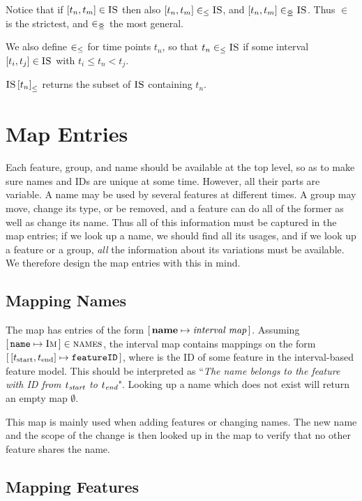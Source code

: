 Notice that if $\interval{t_n}{t_m} \in \map{IS}$ then also $\interval{t_n}{t_m} \inn \map{IS}$, and $\interval{t_n}{t_m} \innr \map{IS}$. Thus $\in$ is the strictest, and $\in_{\leq\!\!\!\!\geq{}}$ the most general.

We also define $\in_\leq$ for time points $t_n$, so that $t_n \in_\leq \textsc{IS}$ if some interval $\interval{t_i}{t_j} \in \map{IS}$ with $t_i \leq t_n < t_j$. 

${\textsc{IS} \left[ t_n \right]}_{\leq}$ returns the subset of $\textsc{IS}$ containing $t_n$.

\section{Map Entries}
\label{sec:map-entries}
Each feature, group, and name should be available at the top level, so as to make sure names and IDs are unique at some time. However, all their parts are variable. A name may be used by several features at different times. A group may move, change its type, or be removed, and a feature can do all of the former as well as change its name. Thus all of this information must be captured in the map entries; if we look up a name, we should find all its usages, and if we look up a feature or a group, \emph{all} the information about its variations must be available. We therefore design the map entries with this in mind.

\subsection{Mapping Names}
\label{sub:mapping-names}

The \names{} map has entries of the form $[ \,\textbf{name}{} \mapsto \textit{interval map}\, ]$. Assuming $[ \,\texttt{name} \mapsto \textsc{Im}\, ] \in \textsc{names}$, the interval map  contains mappings on the form $\intervalmapping{t_\text{start}}{t_\text{end}}{\var{featureID}}$, where  is the ID of some feature in the interval-based feature model. This should be interpreted as ``\emph{The name \emph{} belongs to the feature with ID \emph{} from $t_{\emph{\text{start}}}$ to $t_{\emph{\text{end}}}$}". Looking up a name which does not exist will return an empty map $\emptyset$. 

This map is mainly used when adding features or changing names. The new name and the scope of the change is then looked up in the \names{} map to verify that no other feature shares the name.

\subsection{Mapping Features}
\label{sub:mapping-features}

